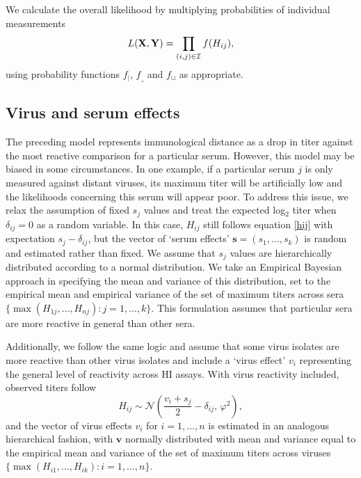 \documentclass[11pt,oneside,letterpaper]{article}
\newcommand{\viruses}{\mathbf{X}}					%
\newcommand{\sera}{\mathbf{Y}}						%
\newcommand{\ve}{v}									%
\newcommand{\se}{s}									%
\newcommand{\ves}{\mathbf{v}}						%
\newcommand{\ses}{\mathbf{s}}						%
\newcommand{\point}{f_{\scriptscriptstyle \vert}}	%
\newcommand{\threshold}{f_{\textstyle \lrcorner}}	%
\newcommand{\interval}{f_{\sqcup}}					%
\newcommand{\mdssd}{\varphi}						%
\newcommand{\vn}{n}									%
\newcommand{\sn}{k}									%
\newcommand{\normal}{\mathcal{N}}					%
\begin{document}
We calculate the overall likelihood by multiplying probabilities of individual measurements
\begin{equation} 
	L(\viruses,\sera) = \prod_{(i,j) \in \cal I} f(H_{ij}),
\end{equation}
using probability functions $\point$, $\threshold$ and $\interval$ as appropriate.

\subsection*{Virus and serum effects}

The preceding model represents immunological distance as a drop in titer against the most reactive comparison for a particular serum.
However, this model may be biased in some circumstances.
In one example, if a particular serum $j$ is only measured against distant viruses, its maximum titer will be artificially low and the likelihoods concerning this serum will appear poor. 
To address this issue, we relax the assumption of fixed $\se_j$ values and treat the expected log$_2$ titer when $\delta_{ij}=0$ as a random variable.
In this case, $H_{ij}$ still follows equation \ref{hij} with expectation $\se_j - \delta_{ij}$, but the vector of `serum effects' $\ses = (\se_1,\ldots,\se_{\sn})$ is random and estimated rather than fixed.
We assume that $\se_j$ values are hierarchically distributed according to a normal distribution.   
We take an Empirical Bayesian approach in specifying the mean and variance of this distribution, set to the empirical mean and empirical variance of the set of maximum titers across sera $\{ \max ( H_{1j},\ldots,H_{\vn j} ) : j = 1,\ldots,\sn \}$.
This formulation assumes that particular sera are more reactive in general than other sera.

Additionally, we follow the same logic and assume that some virus isolates are more reactive than other virus isolates and include a `virus effect' $\ve_i$ representing the general level of reactivity across HI assays. 
With virus reactivity included, observed titers follow
\begin{equation}
	H_{ij} \sim \normal \left( \frac{\ve_i+\se_j}{2} - \delta_{ij}, \, \mdssd^2 \right),
\end{equation}
and the vector of virus effects $\ve_i$ for $i = 1,\ldots, \vn$ is estimated in an analogous hierarchical fashion, with $\ves$ normally distributed with mean and variance equal to the empirical mean and variance of the set of maximum titers across viruses $\{ \max ( H_{i1},\ldots,H_{i \sn} ) : i = 1,\ldots,\vn \}$.
\end{document}
